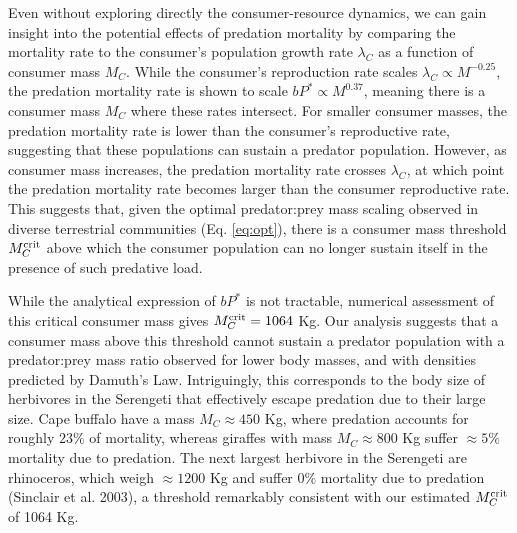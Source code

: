 \documentclass[onecolumn,preprintnumbers,amsmath,amssymb,superscriptaddress]{revtex4}
\begin{document}
Even without exploring directly the consumer-resource dynamics, we can gain insight into the potential effects of predation mortality by comparing the mortality rate to the consumer's population growth rate $\lambda_C$ as a function of consumer mass $M_C$.
While the consumer's reproduction rate scales $\lambda_C \propto M^{-0.25}$, the predation mortality rate is shown to scale $bP^* \propto M^{0.37}$, meaning there is a consumer mass $M_C$ where these rates intersect.
For smaller consumer masses, the predation mortality rate is lower than the consumer's reproductive rate, suggesting that these populations can sustain a predator population.
However, as consumer mass increases, the predation mortality rate crosses $\lambda_C$, at which point the predation mortality rate becomes larger than the consumer reproductive rate.
This suggests that, given the optimal predator:prey mass scaling observed in diverse terrestrial communities (Eq. \ref{eq:opt}), there is a consumer mass threshold $M_C^{\rm crit}$ above which the consumer population can no longer sustain itself in the presence of such predative load.

While the analytical expression of $bP^*$ is not tractable, numerical assessment of this critical consumer mass gives $M_C^{\rm crit} = 1064$ Kg. 
Our analysis suggests that a consumer mass above this threshold cannot sustain a predator population with a predator:prey mass ratio observed for lower body masses, and with densities predicted by Damuth's Law.
Intriguingly, this corresponds to the body size of herbivores in the Serengeti that effectively escape predation due to their large size.
Cape buffalo have a mass $M_C \approx 450$ Kg, where predation accounts for roughly $23\%$ of mortality, whereas giraffes with  mass $M_C \approx 800$ Kg suffer $\approx 5\%$ mortality due to predation.
The next largest herbivore in the Serengeti are rhinoceros, which weigh $\approx 1200$ Kg and suffer $0 \%$ mortality due to predation (Sinclair et al.  2003), a threshold remarkably consistent with our estimated $M_C^{\rm crit}$ of 1064 Kg.
\end{document}

